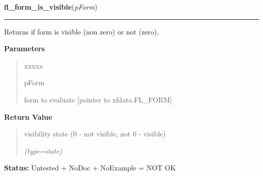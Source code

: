 \hspace{.8\funcindent}\begin{boxedminipage}{\funcwidth}

    \raggedright \textbf{fl\_form\_is\_visible}(\textit{pForm})

    \vspace{-1.5ex}

    \rule{\textwidth}{0.5\fboxrule}
\setlength{\parskip}{2ex}
    Returns if form is visible (non zero) or not (zero).

\setlength{\parskip}{1ex}
      \textbf{Parameters}
      \vspace{-1ex}

      \begin{quote}
        \begin{Ventry}{xxxxx}

          \item[pForm]

          form to evaluate [pointer to xfdata.FL\_FORM]

        \end{Ventry}

      \end{quote}

      \textbf{Return Value}
    \vspace{-1ex}

      \begin{quote}
      visibility state (0 - not visible, not 0 - visible)

      {\it (type=state)}

      \end{quote}

\textbf{Status:} Untested + NoDoc + NoExample = NOT OK



    \end{boxedminipage}

    \label{xformslib:library:fl_form_is_iconified}

    \vspace{0.5ex}

